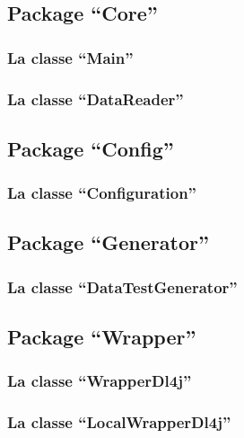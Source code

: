 \documentclass[a4paper,10pt,openany,oneside]{sphinxmanual}
\begin{document}
\subsection{Package ``Core''}
\label{index:package-core}

\subsubsection{La classe ``Main''}
\label{index:la-classe-main}

\subsubsection{La classe ``DataReader''}
\label{index:la-classe-datareader}

\subsection{Package ``Config''}
\label{index:package-config}

\subsubsection{La classe ``Configuration''}
\label{index:la-classe-configuration}

\subsection{Package ``Generator''}
\label{index:package-generator}

\subsubsection{La classe ``DataTestGenerator''}
\label{index:la-classe-datatestgenerator}

\subsection{Package ``Wrapper''}
\label{index:package-wrapper}

\subsubsection{La classe ``WrapperDl4j''}
\label{index:la-classe-wrapperdl4j}

\subsubsection{La classe ``LocalWrapperDl4j''}
\label{index:la-classe-localwrapperdl4j}
\end{document}
